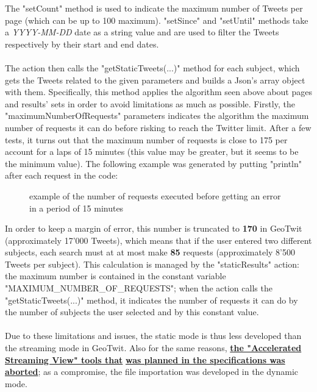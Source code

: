 \documentclass[a4paper,11pt]{report}
\begin{document}
The "setCount" method is used to indicate the maximum number of Tweets per page (which can be up to 100 maximum). "setSince" and "setUntil" methods take a \emph{YYYY-MM-DD} date as a string value and are used to filter the Tweets respectively by their start and end dates.\\\\
The action then calls the "getStaticTweets(...)" method for each subject, which gets the Tweets related to the given parameters and builds a Json's array object with them. Specifically, this method applies the algorithm seen above about pages and results' sets in order to avoid limitations as much as possible. Firstly, the "maximumNumberOfRequests" parameters indicates the algorithm the maximum number of requests it can do before risking to reach the Twitter limit. After a few tests, it turns out that the maximum number of requests is close to 175 per account for a laps of 15 minutes (this value may be greater, but it seems to be the minimum value). The following example was generated by putting "println" after each request in the code:
\begin{figure}[H]
\vspace{-5pt}
\begin{center}
\vspace{-5pt}
\caption{example of the number of requests executed before getting an error in a period of 15 minutes}
\end{center}
\end{figure}
\newpage

In order to keep a margin of error, this number is truncated to \textbf{170} in GeoTwit (approximately 17'000 Tweets), which means that if the user entered two different subjects, each search must at at most make \textbf{85} requests (approximately 8'500 Tweets per subject). This calculation is managed by the "staticResults" action: the maximum number is contained in the constant variable "MAXIMUM\_NUMBER\_OF\_REQUESTS"; when the action calls the "getStaticTweets(...)" method, it indicates the number of requests it can do by the number of subjects the user selected and by this constant value.\\\\
Due to these limitations and issues, the static mode is thus less developed than the streaming mode in GeoTwit. Also for the same reasons, \textbf{\underline{the "Accelerated Streaming View" tools that}} \textbf{\underline{was planned in the specifications was aborted}}; as a compromise, the file importation was developed in the dynamic mode.
\end{document}
